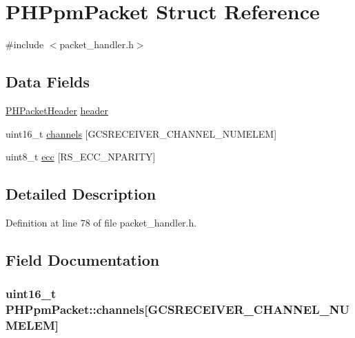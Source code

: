 \hypertarget{struct_p_h_ppm_packet}{\section{\-P\-H\-Ppm\-Packet \-Struct \-Reference}
\label{struct_p_h_ppm_packet}
}


{\ttfamily \#include $<$packet\-\_\-handler.\-h$>$}

\subsection*{\-Data \-Fields}
\begin{DoxyCompactItemize}
\item 
\hyperlink{struct_p_h_packet_header}{\-P\-H\-Packet\-Header} \hyperlink{struct_p_h_ppm_packet_a6dbe9e28bb634aadd35b5c4501589532}{header}
\item 
uint16\-\_\-t \hyperlink{struct_p_h_ppm_packet_a47b34df90a9b106c7be077456b3ba1b2}{channels} \mbox{[}\-G\-C\-S\-R\-E\-C\-E\-I\-V\-E\-R\-\_\-\-C\-H\-A\-N\-N\-E\-L\-\_\-\-N\-U\-M\-E\-L\-E\-M\mbox{]}
\item 
uint8\-\_\-t \hyperlink{struct_p_h_ppm_packet_a4cd9aaabbc588410a6ccc2d333fc224a}{ecc} \mbox{[}\-R\-S\-\_\-\-E\-C\-C\-\_\-\-N\-P\-A\-R\-I\-T\-Y\mbox{]}
\end{DoxyCompactItemize}


\subsection{\-Detailed \-Description}


\-Definition at line 78 of file packet\-\_\-handler.\-h.



\subsection{\-Field \-Documentation}
\hypertarget{struct_p_h_ppm_packet_a47b34df90a9b106c7be077456b3ba1b2}{
\subsubsection[{channels}]{\setlength{\rightskip}{0pt plus 5cm}uint16\-\_\-t {\bf \-P\-H\-Ppm\-Packet\-::channels}\mbox{[}\-G\-C\-S\-R\-E\-C\-E\-I\-V\-E\-R\-\_\-\-C\-H\-A\-N\-N\-E\-L\-\_\-\-N\-U\-M\-E\-L\-E\-M\mbox{]}}}\label{struct_p_h_ppm_packet_a47b34df90a9b106c7be077456b3ba1b2}


